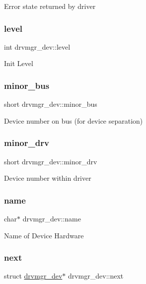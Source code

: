 Error state returned by driver \mbox{\label{structdrvmgr__dev_a36ae5e46a2bd69b67288b8ca52cc37dd}} 
\subsubsection{\texorpdfstring{level}{level}}
{\footnotesize\ttfamily int drvmgr\+\_\+dev\+::level}

Init Level \mbox{\label{structdrvmgr__dev_ad1e8865cac960cfe73cd69c181b6add3}} 
\subsubsection{\texorpdfstring{minor\_bus}{minor\_bus}}
{\footnotesize\ttfamily short drvmgr\+\_\+dev\+::minor\+\_\+bus}

Device number on bus (for device separation) \mbox{\label{structdrvmgr__dev_ab3035ae0bfd6ea769c24bda5e5ca24a5}} 
\subsubsection{\texorpdfstring{minor\_drv}{minor\_drv}}
{\footnotesize\ttfamily short drvmgr\+\_\+dev\+::minor\+\_\+drv}

Device number within driver \mbox{\label{structdrvmgr__dev_a3ca456efcf196648d8c2eefc76f3ee21}} 
\subsubsection{\texorpdfstring{name}{name}}
{\footnotesize\ttfamily char$\ast$ drvmgr\+\_\+dev\+::name}

Name of Device Hardware \mbox{\label{structdrvmgr__dev_a3a9293f08d07aff4edaec9cebd2f7daa}} 
\subsubsection{\texorpdfstring{next}{next}}
{\footnotesize\ttfamily struct \mbox{\hyperlink{structdrvmgr__dev}{drvmgr\+\_\+dev}}$\ast$ drvmgr\+\_\+dev\+::next}


